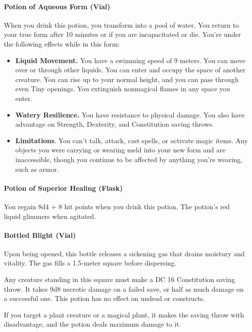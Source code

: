 \paragraph{Potion of Aqueous Form (Vial)}
    When you drink this potion, you transform into a pool of water.
    You return to your true form after 10 minutes or if you are incapacitated or die.
    You're under the following effects while in this form:
    \begin{itemize}
        \item \textbf{Liquid Movement.} You have a swimming speed of 9 meters.
        You can move over or through other liquids.
        You can enter and occupy the space of another creature.
        You can rise up to your normal height, and you can pass through even Tiny openings.
        You extinguish nonmagical flames in any space you enter.
        \item \textbf{Watery Resilience.} You have resistance to physical damage.
        You also have advantage on Strength, Dexterity, and Constitution saving throws.
        \item \textbf{Limitations}. You can't talk, attack, cast spells, or activate magic items.
        Any objects you were carrying or wearing meld into your new form and are inaccessible, though you continue to be affected by anything you're wearing, such as armor.
    \end{itemize}
\paragraph{Potion of Superior Healing (Flask)}
    You regain 8d4 + 8 hit points when you drink this potion. The potion's red liquid glimmers when agitated.
\paragraph{Bottled Blight (Vial)} %
    Upon being opened, this bottle releases a sickening gas that drains moistury and vitality.
    The gas fills a 1.5-meter square before dispersing.

    Any creature standing in this square must make a DC 16 Constitution saving throw.
    It takes 9d8 necrotic damage on a failed save, or half as much damage on a successful one.
    This potion has no effect on undead or constructs.

    If you target a plant creature or a magical plant, it makes the saving throw with disadvantage, and the potion deals maximum damage to it.

